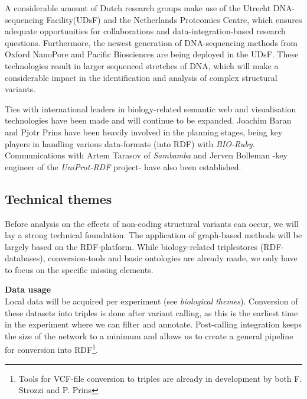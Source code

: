 \documentclass[twoside,fontsize=12pt]{article}
\begin{document}
A considerable amount of Dutch research groups make use of the Utrecht DNA-sequencing Facility(UDsF) and the Netherlands Proteomics Centre, which ensures adequate opportunities for collaborations and data-integration-based research questions. Furthermore, the newest generation of DNA-sequencing methods from Oxford NanoPore and Pacific Biosciences are being deployed in the UDsF. These technologies result in larger sequenced stretches of DNA, which will make a considerable impact in the identification and analysis of complex structural variants.

Ties with international leaders in biology-related semantic web and visualisation technologies have been made and will continue to be expanded. Joachim Baran and Pjotr Prins have been heavily involved in the planning stages, being key players in handling various data-formats (into RDF) with \textit{BIO-Ruby}. Communications with Artem Tarasov of \textit{Sambamba} and Jerven Bolleman -key engineer of the \textit{UniProt-RDF} project- have also been established.
%	
%
%
%



\subsection*{Technical themes}
Before analysis on the effects of non-coding structural variants can occur, we will lay a strong technical foundation. The application of graph-based methods will be largely based on the RDF-platform. While biology-related triplestores (RDF-databases), conversion-tools and basic ontologies are already made, we only have to focus on the specific missing elements.
\medskip

\noindent
\textbf{Data usage} \\
Local data will be acquired per experiment (see \emph{biological themes}). Conversion of these datasets into triples is done after variant calling, as this is the earliest time in the experiment where we can filter and annotate. Post-calling integration keeps the size of the network to a minimum and allows us to create a general pipeline for conversion into RDF\footnote{Tools for VCF-file conversion to triples are already in development by both F. Strozzi and P. Prins\cite{Strozzi2013,biorubyrdf}}.
 
\end{document}
